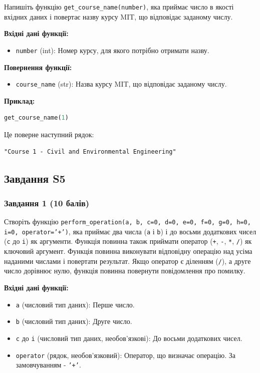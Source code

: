 \documentclass[12pt]{article}
\begin{document}
Напишіть функцію \texttt{get\_course\_name(number)}, яка приймає число в якості вхідних даних і повертає назву курсу MIT, що відповідає заданому числу.

\textbf{Вхідні дані функції:}
\begin{itemize}
\item \texttt{number} (int): Номер курсу, для якого потрібно отримати назву.
\end{itemize}

\textbf{Повернення функції:}
\begin{itemize}
\item \texttt{course\_name} (str): Назва курсу MIT, що відповідає заданому числу.
\end{itemize}

\textbf{Приклад:}
\begin{lstlisting}[language=Python]
get_course_name(1)
\end{lstlisting}
Це поверне наступний рядок:
\begin{verbatim}
"Course 1 - Civil and Environmental Engineering"
\end{verbatim}


\newpage
\subsection{Завдання S5}

\subsubsection{Завдання 1 (10 балів)}
Створіть функцію \texttt{perform\_operation(a, b, c=0, d=0, e=0, f=0, g=0, h=0, i=0, operator='+')}, яка приймає два числа (\texttt{a} і \texttt{b}) і до восьми додаткових чисел (\texttt{c} до \texttt{i}) як аргументи. Функція повинна також приймати оператор (\texttt{+}, \texttt{-}, \texttt{*}, \texttt{/}) як ключовий аргумент. Функція повинна виконувати відповідну операцію над усіма наданими числами і повертати результат. Якщо оператор є діленням (\texttt{/}), а друге число дорівнює нулю, функція повинна повернути повідомлення про помилку.

\textbf{Вхідні дані функції:}
\begin{itemize}
\item \texttt{a} (числовий тип даних): Перше число.
\item \texttt{b} (числовий тип даних): Друге число.
\item \texttt{c} до \texttt{i} (числовий тип даних, необов'язкові): До восьми додаткових чисел.
\item \texttt{operator} (рядок, необов'язковий): Оператор, що визначає операцію. За замовчуванням - \texttt{'+'}.
\end{itemize}
\end{document}

